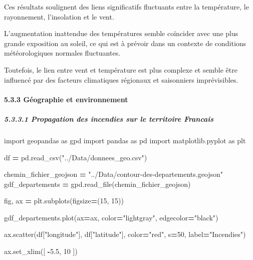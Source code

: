 \documentclass[
]{article}
\newenvironment{Shaded}{\begin{snugshade}}{\end{snugshade}}
\newcommand{\DecValTok}[1]{\textcolor[rgb]{0.00,0.00,0.81}{#1}}
\newcommand{\FloatTok}[1]{\textcolor[rgb]{0.00,0.00,0.81}{#1}}
\newcommand{\ImportTok}[1]{#1}
\newcommand{\NormalTok}[1]{#1}
\newcommand{\OperatorTok}[1]{\textcolor[rgb]{0.81,0.36,0.00}{\textbf{#1}}}
\newcommand{\StringTok}[1]{\textcolor[rgb]{0.31,0.60,0.02}{#1}}
\begin{document}
Ces résultats soulignent des liens significatifs fluctuants entre la
température, le rayonnement, l'insolation et le vent.

L'augmentation inattendue des températures semble coïncider avec une
plus grande exposition au soleil, ce qui est à prévoir dans un contexte
de conditions météorologiques normales fluctuantes.

Toutefois, le lien entre vent et température est plus complexe et semble
être influencé par des facteurs climatiques régionaux et saisonniers
imprévisibles.

\paragraph{5.3.3 Géographie et
environnement}\label{guxe9ographie-et-environnement}

\subparagraph{5.3.3.1 Propagation des incendies sur le territoire
Francais}\label{propagation-des-incendies-sur-le-territoire-francais}

\begin{Shaded}
\begin{Highlighting}[]
\ImportTok{import}\NormalTok{ geopandas }\ImportTok{as}\NormalTok{ gpd}
\ImportTok{import}\NormalTok{ pandas }\ImportTok{as}\NormalTok{ pd}
\ImportTok{import}\NormalTok{ matplotlib.pyplot }\ImportTok{as}\NormalTok{ plt}

\NormalTok{df }\OperatorTok{=}\NormalTok{ pd.read\_csv(}\StringTok{"../Data/donnees\_geo.csv"}\NormalTok{)}

\NormalTok{chemin\_fichier\_geojson }\OperatorTok{=} \StringTok{"../Data/contour{-}des{-}departements.geojson"}  
\NormalTok{gdf\_departements }\OperatorTok{=}\NormalTok{ gpd.read\_file(chemin\_fichier\_geojson)}

\NormalTok{fig, ax }\OperatorTok{=}\NormalTok{ plt.subplots(figsize}\OperatorTok{=}\NormalTok{(}\DecValTok{15}\NormalTok{, }\DecValTok{15}\NormalTok{))  }

\NormalTok{gdf\_departements.plot(ax}\OperatorTok{=}\NormalTok{ax, color}\OperatorTok{=}\StringTok{"lightgray"}\NormalTok{, edgecolor}\OperatorTok{=}\StringTok{"black"}\NormalTok{)}

\NormalTok{ax.scatter(df[}\StringTok{"longitude"}\NormalTok{], df[}\StringTok{"latitude"}\NormalTok{], color}\OperatorTok{=}\StringTok{"red"}\NormalTok{, s}\OperatorTok{=}\DecValTok{50}\NormalTok{, label}\OperatorTok{=}\StringTok{"Incendies"}\NormalTok{)  }


\NormalTok{ax.set\_xlim([ }\OperatorTok{{-}}\FloatTok{5.5}\NormalTok{, }\DecValTok{10}\NormalTok{ ])}
\end{Highlighting}
\end{Shaded}
\end{document}
